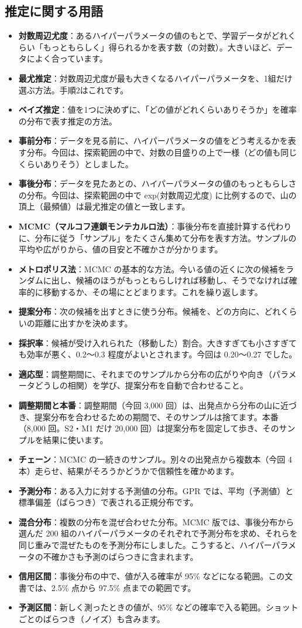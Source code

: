 \documentclass[paper=a4paper,fontsize=10.5pt,line_length=44zw,number_of_lines=38]{jlreq}
\newenvironment{termlist}{\begin{itemize}[label=・,leftmargin=1\zw,labelwidth=1\zw,labelsep=0pt,itemsep=0.4ex,topsep=0.6ex,parsep=0pt]}{\end{itemize}}
\newcommand{\term}[1]{\item \textbf{#1}：}
\begin{document}
\subsection{推定に関する用語}
\begin{termlist}
\term{対数周辺尤度}あるハイパーパラメータの値のもとで、学習データがどれくらい「もっともらしく」得られるかを表す数（の対数）。大きいほど、データによく合っています。
\term{最尤推定}対数周辺尤度が最も大きくなるハイパーパラメータを、1組だけ選ぶ方法。手順2はこれです。
\term{ベイズ推定}値を1つに決めずに、「どの値がどれくらいありそうか」を確率の分布で表す推定の方法。
\term{事前分布}データを見る前に、ハイパーパラメータの値をどう考えるかを表す分布。今回は、探索範囲の中で、対数の目盛りの上で一様（どの値も同じくらいありそう）としました。
\term{事後分布}データを見たあとの、ハイパーパラメータの値のもっともらしさの分布。今回は、探索範囲の中で exp(対数周辺尤度) に比例するので、山の頂上（最頻値）は最尤推定の値と一致します。
\term{MCMC（マルコフ連鎖モンテカルロ法）}事後分布を直接計算する代わりに、分布に従う「サンプル」をたくさん集めて分布を表す方法。サンプルの平均や広がりから、値の目安と不確かさが分かります。
\term{メトロポリス法}MCMC の基本的な方法。今いる値の近くに次の候補をランダムに出し、候補のほうがもっともらしければ移動し、そうでなければ確率的に移動するか、その場にとどまります。これを繰り返します。
\term{提案分布}次の候補を出すときに使う分布。候補を、どの方向に、どれくらいの距離に出すかを決めます。
\term{採択率}候補が受け入れられた（移動した）割合。大きすぎても小さすぎても効率が悪く、0.2〜0.3 程度がよいとされます。今回は 0.20〜0.27 でした。
\term{適応型}調整期間に、それまでのサンプルから分布の広がりや向き（パラメータどうしの相関）を学び、提案分布を自動で合わせること。
\term{調整期間と本番}調整期間（今回 3,000 回）は、出発点から分布の山に近づき、提案分布を合わせるための期間で、そのサンプルは捨てます。本番（8,000 回。S2・M1 だけ 20,000 回）は提案分布を固定して歩き、そのサンプルを結果に使います。
\term{チェーン}MCMC の一続きのサンプル。別々の出発点から複数本（今回 4 本）走らせ、結果がそろうかどうかで信頼性を確かめます。
\term{予測分布}ある入力に対する予測値の分布。GPR では、平均（予測値）と標準偏差（ばらつき）で表される正規分布です。
\term{混合分布}複数の分布を混ぜ合わせた分布。MCMC 版では、事後分布から選んだ 200 組のハイパーパラメータのそれぞれで予測分布を求め、それらを同じ重みで混ぜたものを予測分布にしました。こうすると、ハイパーパラメータの不確かさも予測のばらつきに含まれます。
\term{信用区間}事後分布の中で、値が入る確率が 95\% などになる範囲。この文書では、2.5\% 点から 97.5\% 点までの範囲です。
\term{予測区間}新しく測ったときの値が、95\% などの確率で入る範囲。ショットごとのばらつき（ノイズ）も含みます。
\end{termlist}
\end{document}
